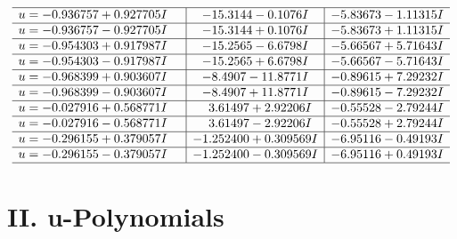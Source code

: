 \documentclass[1p]{elsarticle_modified}
\theoremstyle{definition}
\begin{document}
$$\begin{array}{c|c|c}
 \hline 
\begin{aligned}
u &= -0.936757 + 0.927705 I\end{aligned}
 & -15.3144 - 0.1076 I & -5.83673 - 1.11315 I \\ \hline\begin{aligned}
u &= -0.936757 - 0.927705 I\end{aligned}
 & -15.3144 + 0.1076 I & -5.83673 + 1.11315 I \\ \hline\begin{aligned}
u &= -0.954303 + 0.917987 I\end{aligned}
 & -15.2565 - 6.6798 I & -5.66567 + 5.71643 I \\ \hline\begin{aligned}
u &= -0.954303 - 0.917987 I\end{aligned}
 & -15.2565 + 6.6798 I & -5.66567 - 5.71643 I \\ \hline\begin{aligned}
u &= -0.968399 + 0.903607 I\end{aligned}
 & -8.4907 - 11.8771 I & -0.89615 + 7.29232 I \\ \hline\begin{aligned}
u &= -0.968399 - 0.903607 I\end{aligned}
 & -8.4907 + 11.8771 I & -0.89615 - 7.29232 I \\ \hline\begin{aligned}
u &= -0.027916 + 0.568771 I\end{aligned}
 & \phantom{-}3.61497 + 2.92206 I & -0.55528 - 2.79244 I \\ \hline\begin{aligned}
u &= -0.027916 - 0.568771 I\end{aligned}
 & \phantom{-}3.61497 - 2.92206 I & -0.55528 + 2.79244 I \\ \hline\begin{aligned}
u &= -0.296155 + 0.379057 I\end{aligned}
 & -1.252400 + 0.309569 I & -6.95116 - 0.49193 I \\ \hline\begin{aligned}
u &= -0.296155 - 0.379057 I\end{aligned}
 & -1.252400 - 0.309569 I & -6.95116 + 0.49193 I\\
 \hline 
 \end{array}$$\newpage
\newpage\renewcommand{\arraystretch}{1}
\centering \section*{ II. u-Polynomials}
\end{document}
